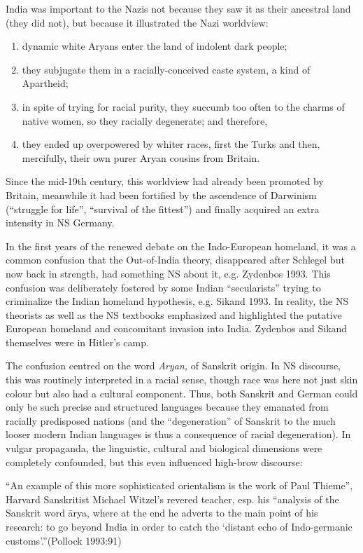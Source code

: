 India was important to the Nazis not because they saw it as their ancestral land (they did not), but because it illustrated the Nazi worldview: 
{%
\begin{enumerate}
\item dynamic white Aryans enter the land of indolent dark people; 
\item they subjugate them in a racially-conceived caste system, a kind of Apartheid; 
\item in spite of trying for racial purity, they succumb too often to the charms of native women, so they racially degenerate; and therefore, 
\item they ended up overpowered by whiter races, first the Turks and then, mercifully, their own purer Aryan cousins from Britain. 
\end{enumerate}}
Since the mid-19th century, this worldview had already been promoted by Britain, meanwhile it had been fortified by the ascendence of Darwinism (“struggle for life”, “survival of the fittest”) and finally acquired an extra intensity in NS Germany.

In the first years of the renewed debate on the Indo-European homeland, it was a common confusion that the Out-of-India theory, disappeared after Schlegel but now back in strength, had something NS about it, e.g. Zydenbos 1993. This confusion was deliberately fostered by some Indian “secularists” trying to criminalize the Indian homeland hypothesis, e.g. Sikand 1993. In reality, the NS theorists as well as the NS textbooks emphasized and highlighted the putative European homeland and concomitant invasion into India. Zydenbos and Sikand themselves were in Hitler’s camp.

The confusion centred on the word {\sl Aryan,} of Sanskrit origin. In NS discourse, this was routinely interpreted in a racial sense, though race was here not just skin colour but also had a cultural component. Thus, both Sanskrit and German could only be such precise and structured languages because they emanated from racially predisposed nations (and the “degeneration” of Sanskrit to the much looser modern Indian languages is thus a consequence of racial degeneration). In vulgar propaganda, the linguistic, cultural and biological dimensions were completely confounded, but this even influenced high-brow discourse: 
\begin{myquote}
“An example of this more sophisticated orientalism is the work of Paul Thieme”, Harvard Sanskritist Michael Witzel’s revered teacher, esp. his “analysis of the Sanskrit word ārya, where at the end he adverts to the main point of his research: to go beyond India in order to catch the ‘distant echo of Indo-germanic customs’.”\hfill (Pollock 1993:91)
\end{myquote}

